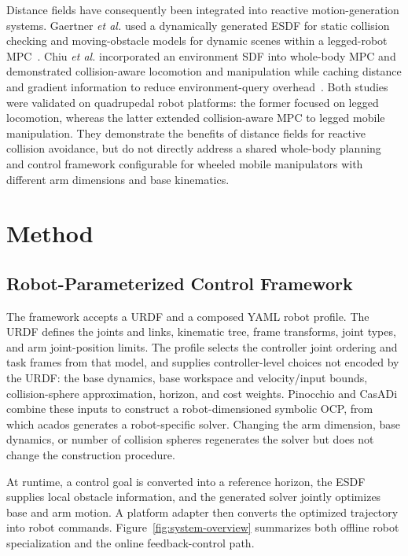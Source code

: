 \documentclass[conference]{IEEEtran}
\begin{document}
Distance fields have consequently been integrated into reactive
motion-generation systems.  Gaertner \emph{et al.} used a dynamically generated
ESDF for static collision checking and moving-obstacle models for dynamic
scenes within a legged-robot MPC~\cite{gaertner2021collisionfree}.  Chiu \emph{et al.} incorporated
an environment SDF into whole-body MPC and demonstrated collision-aware
locomotion and manipulation while caching distance and gradient information to
reduce environment-query overhead~\cite{chiu2022collisionfree}.  Both studies
were validated on quadrupedal robot platforms: the former focused on legged
locomotion, whereas the latter extended collision-aware MPC to legged mobile
manipulation.  They demonstrate the benefits of distance fields for reactive
collision avoidance, but do not directly address a shared whole-body planning
and control framework configurable for wheeled mobile manipulators with
different arm dimensions and base kinematics.

\section{Method}

\subsection{Robot-Parameterized Control Framework}

The framework accepts a URDF and a composed YAML robot profile.  The URDF
defines the joints and links, kinematic tree, frame transforms, joint types,
and arm joint-position limits.  The profile selects the controller joint
ordering and task frames from that model, and supplies controller-level choices
not encoded by the URDF: the base dynamics, base workspace and velocity/input
bounds, collision-sphere approximation, horizon, and cost weights.  Pinocchio
and CasADi combine these inputs to construct a robot-dimensioned symbolic OCP,
from which acados generates a robot-specific solver.
Changing the arm dimension, base dynamics, or number of collision spheres
regenerates the solver but does not change the construction procedure.

At runtime, a control goal is converted into a reference horizon,
the ESDF supplies local obstacle information, and the generated solver jointly
optimizes base and arm motion.  A platform adapter then converts the optimized
trajectory into robot commands.  Figure~\ref{fig:system-overview} summarizes
both offline robot specialization and the online feedback-control path.
\end{document}
